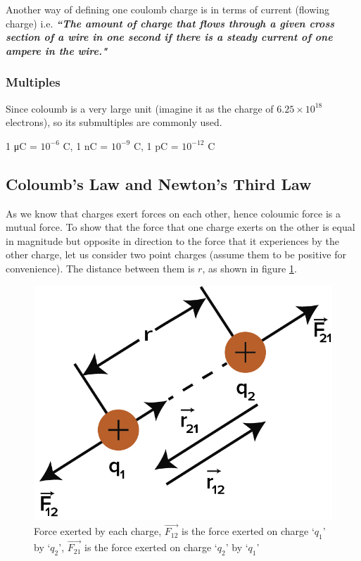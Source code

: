 Another way of defining one coulomb charge is in
terms of current (flowing charge) i.e. \textit{\textbf{``The amount of charge that flows
through a given cross section of a wire in one second if there is a steady
current of one ampere in the wire."}}
\subsubsection{Multiples}
Since coloumb is a very large unit (imagine it as the charge of $6.25\times 10^{18}$ electrons),
so its submultiples are commonly used.
\begin{center}
1 μC = $10^{-6}$ C, 1 nC = $10^{-9}$ C,
1 pC = $10^{-12}$ C
\end{center}
\subsection{Coloumb's Law and Newton's Third Law}
As we know that charges exert forces on each other,
hence coloumic force is a mutual force.
To show that the force that one charge exerts on the other is
equal in magnitude but opposite in direction to the force that
it experiences by the other charge,
let us consider two point charges (assume them to be positive for convenience).
The distance between them is $r$, as shown in figure \ref{fig:11.1}.
\begin{figure}[H]
  \centering
  \includegraphics[scale = 0.8]{Images/Chapter-11/11.1.png}
  \caption{Force exerted by each charge, $\vec{F_{12}}$ is the force
  exerted  on charge `$q_{1}$' by `$q_{2}$', $\vec{F_{21}}$ is the force exerted on charge `$q_{2}$' by `$q_{1}$'}
  \label{fig:11.1}
\end{figure}

